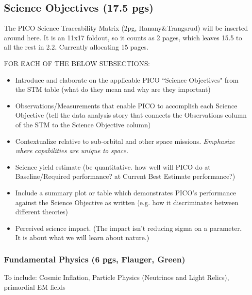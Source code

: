 \documentclass[12pt]{article}
\begin{document}
      

\subsection{Science Objectives (17.5 pgs) } 

  The PICO Science Traceability Matrix (2pg, Hanany\&Trangsrud) will be inserted around here.  It is an 11x17 foldout, so it counts as 2 pages, which leaves 15.5 to all the rest in 2.2. Currently allocating 15 pages.  
    
    \vspace{12pt}
     FOR EACH OF THE BELOW SUBSECTIONS:
    \begin{itemize}
    \item Introduce and elaborate on the applicable PICO ``Science Objectives" from the STM table (what do they mean and why are they important)
    \item Observations/Measurements that enable PICO to accomplish each Science Objective (tell the data analysis story that connects the Observations column of the STM to the Science Objective column)
    \item Contextualize relative to sub-orbital and other space missions. {\it Emphasize where capabilities are unique to space.}
    \item Science yield estimate (be quantitative. how well will PICO do at Baseline/Required performance? at Current Best Estimate performance?)
    \item Include a summary plot or table which demonstrates PICO's performance against the Science Objective as written (e.g. how it discriminates between different theories) 
    \item Perceived science impact. (The impact isn't reducing sigma on a parameter.  It is about what we will learn about nature.)
    \end{itemize}


\subsubsection{Fundamental Physics (6 pgs, Flauger, Green)}

To include: Cosmic Inflation, Particle Physics (Neutrinos and Light Relics), primordial EM fields
\end{document}
